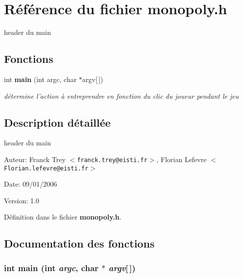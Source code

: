 \section{R\'{e}f\'{e}rence du fichier monopoly.h}
\label{monopoly_8h}
header du main 

\subsection*{Fonctions}
\begin{CompactItemize}
\item 
int {\bf main} (int argc, char $\ast$argv[$\,$])
\begin{CompactList}\small\item\em d\'{e}termine l'action \`{a} entreprendre en fonction du clic du joueur pendant le jeu \item\end{CompactList}\end{CompactItemize}


\subsection{Description d\'{e}taill\'{e}e}
header du main 

\begin{Desc}
\item[Auteur:]Franck Trey $<${\tt franck.trey@eisti.fr}$>$, Florian Lefevre $<${\tt Florian.lefevre@eisti.fr}$>$ \end{Desc}
\begin{Desc}
\item[Date:]09/01/2006 \end{Desc}
\begin{Desc}
\item[Version:]1.0 \end{Desc}


D\'{e}finition dans le fichier {\bf monopoly.h}.

\subsection{Documentation des fonctions}
\subsubsection{\setlength{\rightskip}{0pt plus 5cm}int main (int {\em argc}, char $\ast$ {\em argv}[$\,$])}\label{monopoly_8h_0ddf1224851353fc92bfbff6f499fa97}


